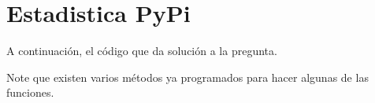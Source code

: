 \section{Estadistica PyPi}

A continuación, el código que da solución a la pregunta.

Note que existen varios métodos ya programados para hacer algunas de las funciones.
  